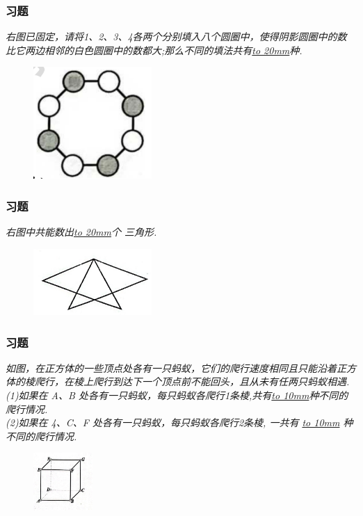 \begin{frame}
    \frametitle{习题\theframecounter}
    \textit{右图已固定，请将1、2、3、4各两个分别填入八个圆圈中，使得阴影圆圈中的数比它两边相邻的白色圆圈中的数都大;那么不同的填法共有\underline{\hbox to 20mm{}}种.}
    \begin{figure}[H] 
        \centering
        \includegraphics[width=0.4\textwidth]{./pics/Chapter_6/6.png}
    \end{figure}
\end{frame}

\begin{frame}
    \frametitle{习题\theframecounter}
    \textit{右图中共能数出\underline{\hbox to 20mm{}}个 三角形.}
    \begin{figure}[H] 
        \centering
        \includegraphics[width=0.4\textwidth]{./pics/Chapter_6/7.png}
    \end{figure}
\end{frame}


\begin{frame}
    \frametitle{习题\theframecounter}
    \textit{如图，在正方体的一些顶点处各有一只蚂蚁，它们的爬行速度相同且只能沿着正方体的棱爬行，在棱上爬行到达下一个顶点前不能回头，且从未有任两只蚂蚁相遇.\\
    (1)如果在 A、B 处各有一只蚂蚁，每只蚂蚁各爬行1条棱,共有\underline{\hbox to 10mm{}}种不同的爬行情况.\\
    (2)如果在 4、C、F 处各有一只蚂蚁，每只蚂蚁各爬行2条棱, 
    一共有 \underline{\hbox to 10mm{}} 种不同的爬行情况.
    }
    \begin{figure}[H] 
        \centering
        \includegraphics[width=0.2\textwidth]{./pics/Chapter_4/2.png}
    \end{figure}
\end{frame}


